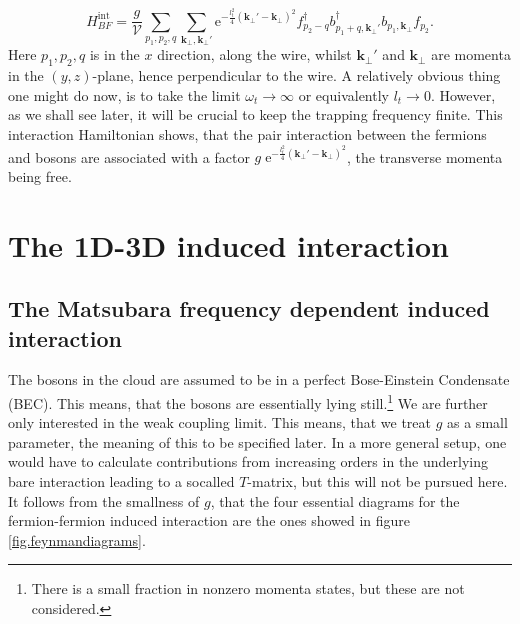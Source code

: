 \begin{equation}
H_{BF}^\text{int} = \frac{g}{\mathcal{V}}\sum_{p_1,p_2,q} \sum_{\mathbf{k}_\perp, \mathbf{k}_\perp'} \text{e}^{-\frac{l_t^2}{4}(\mathbf{k}_\perp'-\mathbf{k}_\perp)^2} f_{p_2-q}^\dagger b_{p_1+q, \mathbf{k}_\perp'}^\dagger b_{p_1,\mathbf{k}_\perp}f_{p_2}.
\end{equation}
Here  $p_1,p_2,q$ is in the $x$ direction, along the wire, whilst $\mathbf{k}_\perp'$ and $\mathbf{k}_\perp$ are momenta in the $(y,z)$-plane, hence perpendicular to the wire. A relatively obvious thing one might do now, is to take the limit $\omega_t \to \infty$ or equivalently $l_t \to 0$. However, as we shall see later, it will be crucial to keep the trapping frequency finite. This interaction Hamiltonian shows, that the pair interaction between the fermions and bosons are associated with a factor $g\; \text{e}^{-\frac{l_t^2}{4}(\mathbf{k}_\perp'-\mathbf{k}_\perp)^2}$, the transverse momenta being free. 

\section{The 1D-3D induced interaction}
\subsection{The Matsubara frequency dependent induced interaction}
The bosons in the cloud are assumed to be in a perfect Bose-Einstein Condensate (BEC). This means, that the bosons are essentially lying still.\footnote{There is a small fraction in nonzero momenta states, but these are not considered.}  We are further only interested in the weak coupling limit. This means, that we treat $g$ as a small parameter, the meaning of this to be specified later. In a more general setup, one would have to calculate contributions from increasing orders in the underlying bare interaction leading to a socalled $T$-matrix, but this will not be pursued here. It follows from the smallness of $g$, that the four essential diagrams for the fermion-fermion induced interaction are the ones showed in figure \ref{fig.feynmandiagrams}. 

